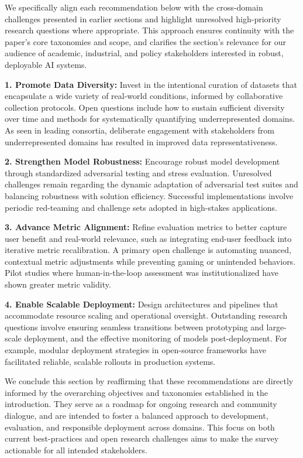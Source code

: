 \documentclass[sigconf]{acmart}
\begin{document}
We specifically align each recommendation below with the cross-domain challenges presented in earlier sections and highlight unresolved high-priority research questions where appropriate. This approach ensures continuity with the paper's core taxonomies and scope, and clarifies the section's relevance for our audience of academic, industrial, and policy stakeholders interested in robust, deployable AI systems.

\textbf{1. Promote Data Diversity:} Invest in the intentional curation of datasets that encapsulate a wide variety of real-world conditions, informed by collaborative collection protocols. Open questions include how to sustain sufficient diversity over time and methods for systematically quantifying underrepresented domains. As seen in leading consortia, deliberate engagement with stakeholders from underrepresented domains has resulted in improved data representativeness.

\textbf{2. Strengthen Model Robustness:} Encourage robust model development through standardized adversarial testing and stress evaluation. Unresolved challenges remain regarding the dynamic adaptation of adversarial test suites and balancing robustness with solution efficiency. Successful implementations involve periodic red-teaming and challenge sets adopted in high-stakes applications.

\textbf{3. Advance Metric Alignment:} Refine evaluation metrics to better capture user benefit and real-world relevance, such as integrating end-user feedback into iterative metric recalibration. A primary open challenge is automating nuanced, contextual metric adjustments while preventing gaming or unintended behaviors. Pilot studies where human-in-the-loop assessment was institutionalized have shown greater metric validity.

\textbf{4. Enable Scalable Deployment:} Design architectures and pipelines that accommodate resource scaling and operational oversight. Outstanding research questions involve ensuring seamless transitions between prototyping and large-scale deployment, and the effective monitoring of models post-deployment. For example, modular deployment strategies in open-source frameworks have facilitated reliable, scalable rollouts in production systems.

We conclude this section by reaffirming that these recommendations are directly informed by the overarching objectives and taxonomies established in the introduction. They serve as a roadmap for ongoing research and community dialogue, and are intended to foster a balanced approach to development, evaluation, and responsible deployment across domains. This focus on both current best-practices and open research challenges aims to make the survey actionable for all intended stakeholders.
\end{document}
